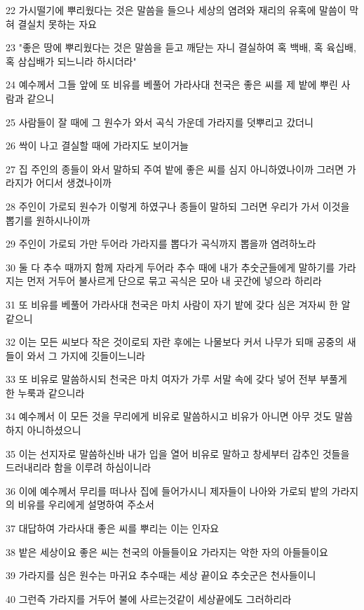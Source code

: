 \par 22 가시떨기에 뿌리웠다는 것은 말씀을 들으나 세상의 염려와 재리의 유혹에 말씀이 막혀 결실치 못하는 자요
\par 23 "좋은 땅에 뿌리웠다는 것은 말씀을 듣고 깨닫는 자니 결실하여 혹 백배, 혹 육십배, 혹 삼십배가 되느니라 하시더라"
\par 24 예수께서 그들 앞에 또 비유를 베풀어 가라사대 천국은 좋은 씨를 제 밭에 뿌린 사람과 같으니
\par 25 사람들이 잘 때에 그 원수가 와서 곡식 가운데 가라지를 덧뿌리고 갔더니
\par 26 싹이 나고 결실할 때에 가라지도 보이거늘
\par 27 집 주인의 종들이 와서 말하되 주여 밭에 좋은 씨를 심지 아니하였나이까 그러면 가라지가 어디서 생겼나이까
\par 28 주인이 가로되 원수가 이렇게 하였구나 종들이 말하되 그러면 우리가 가서 이것을 뽑기를 원하시나이까
\par 29 주인이 가로되 가만 두어라 가라지를 뽑다가 곡식까지 뽑을까 염려하노라
\par 30 둘 다 추수 때까지 함께 자라게 두어라 추수 때에 내가 추숫군들에게 말하기를 가라지는 먼저 거두어 불사르게 단으로 묶고 곡식은 모아 내 곳간에 넣으라 하리라
\par 31 또 비유를 베풀어 가라사대 천국은 마치 사람이 자기 밭에 갖다 심은 겨자씨 한 알 같으니
\par 32 이는 모든 씨보다 작은 것이로되 자란 후에는 나물보다 커서 나무가 되매 공중의 새들이 와서 그 가지에 깃들이느니라
\par 33 또 비유로 말씀하시되 천국은 마치 여자가 가루 서말 속에 갖다 넣어 전부 부풀게 한 누룩과 같으니라
\par 34 예수께서 이 모든 것을 무리에게 비유로 말씀하시고 비유가 아니면 아무 것도 말씀하지 아니하셨으니
\par 35 이는 선지자로 말씀하신바 내가 입을 열어 비유로 말하고 창세부터 감추인 것들을 드러내리라 함을 이루려 하심이니라
\par 36 이에 예수께서 무리를 떠나사 집에 들어가시니 제자들이 나아와 가로되 밭의 가라지의 비유를 우리에게 설명하여 주소서
\par 37 대답하여 가라사대 좋은 씨를 뿌리는 이는 인자요
\par 38 밭은 세상이요 좋은 씨는 천국의 아들들이요 가라지는 악한 자의 아들들이요
\par 39 가라지를 심은 원수는 마귀요 추수때는 세상 끝이요 추숫군은 천사들이니
\par 40 그런즉 가라지를 거두어 불에 사르는것같이 세상끝에도 그러하리라
